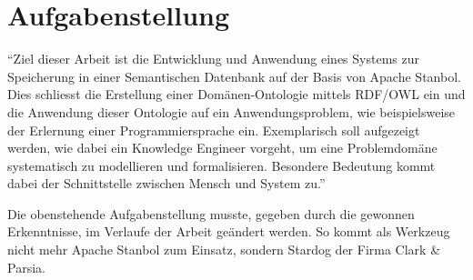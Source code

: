 \chapter{Aufgabenstellung}
\label{chap:Aufgabenstellung}


``Ziel dieser Arbeit ist die Entwicklung und Anwendung eines Systems zur Speicherung in einer Semantischen Datenbank auf der Basis von Apache Stanbol. Dies schliesst die Erstellung einer Domänen-Ontologie mittels RDF/OWL ein und die Anwendung dieser Ontologie auf ein Anwendungsproblem, wie beispielsweise der Erlernung einer Programmiersprache ein. Exemplarisch soll aufgezeigt werden, wie dabei ein Knowledge Engineer vorgeht, um eine Problemdomäne systematisch zu modellieren und formalisieren. Besondere Bedeutung kommt dabei der Schnittstelle zwischen Mensch und System zu.''~\cite{Aufgabenstellung}

Die obenstehende Aufgabenstellung musste, gegeben durch die gewonnen Erkenntnisse, im Verlaufe der Arbeit geändert werden. So kommt als Werkzeug nicht mehr Apache Stanbol zum Einsatz, sondern Stardog der Firma Clark \& Parsia.
